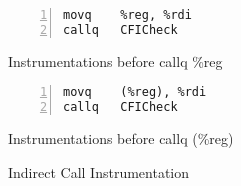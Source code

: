 \begin{figure}[hbp]
\begin{center}
\begin{minipage}{0.3\textwidth}
\begin{lstlisting}[basicstyle=\scriptsize,numbers=left]
movq	%reg, %rdi
callq	CFICheck
\end{lstlisting}
\small{Instrumentations before callq \*\%reg}
\end{minipage}
\begin{minipage}{0.3\textwidth}
\begin{lstlisting}[basicstyle=\scriptsize,numbers=left]
movq	(%reg), %rdi
callq	CFICheck
\end{lstlisting}
\small{Instrumentations before callq \*(\%reg)}
\end{minipage}
\end{center}
\caption{Indirect Call Instrumentation}\label{fg-indirect}
\end{figure}